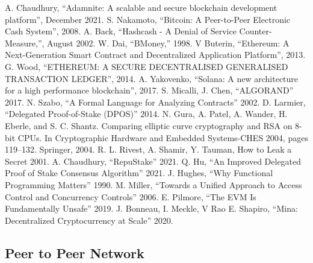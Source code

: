 \documentclass[conference]{IEEEtran}
\begin{document}
\begin{thebibliography}{00}
 A. Chaudhury, ``Adamnite: A scalable and secure
blockchain development platform'', December 2021.
 S. Nakamoto, ``Bitcoin: A Peer-to-Peer Electronic Cash System'', 2008.
 A. Back, ``Hashcash - A Denial of Service Counter-Measure,'', August 2002.
 W. Dai, ``BMoney,'' 1998.
 V Buterin, ``Ethereum: A Next-Generation Smart
Contract and Decentralized Application Platform'',
2013.
 G. Wood, ``ETHEREUM: A SECURE DECENTRALISED GENERALISED TRANSACTION LEDGER'', 2014.
 A. Yakovenko, ``Solana: A new architecture for a high
performance blockchain'', 2017.
 S. Micalli, J. Chen, ``ALGORAND'' 2017.
 N. Szabo, ``A Formal Language for Analyzing Contracts'' 2002.
 D. Larmier, ``Delegated Proof-of-Stake (DPOS)'' 2014.
 N. Gura, A. Patel, A. Wander, H. Eberle,
and S. C. Shantz. Comparing elliptic curve
cryptography and RSA on 8-bit CPUs. In Cryptographic
Hardware and Embedded Systems-CHES 2004, pages
119–132. Springer, 2004.
 R. L. Rivest, A. Shamir, Y. Tauman, How to Leak a Secret 2001.
 A. Chaudhury, ``RepuStake'' 2021.
 Q. Hu, ``An Improved Delegated Proof of Stake Consensus Algorithm'' 2021.
 J. Hughes, ``Why
Functional Programming
Matters'' 1990.
 M. Miller, ``Towards a Unified Approach to Access Control and Concurrency Controls'' 2006.
 E. Pilmore, ``The EVM Is Fundamentally Unsafe'' 2019.
 J. Bonneau, I. Meckle, V Rao
 E. Shapiro, ``Mina: Decentralized Cryptocurrency at Scale'' 2020.
 




\end{thebibliography}

\appendix

\subsection{Peer to Peer Network} 
\end{document}
